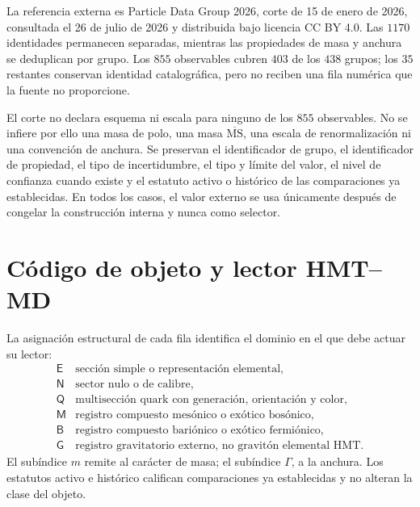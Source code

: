 La referencia externa es Particle Data Group 2026, corte de 15 de enero de
2026, consultada el 26 de julio de 2026 y distribuida bajo licencia CC BY 4.0.
Las \(1170\) identidades permanecen separadas, mientras las propiedades de masa
y anchura se deduplican por grupo. Los \(855\) observables cubren \(403\) de los
\(438\) grupos; los \(35\) restantes conservan identidad catalográfica, pero no
reciben una fila numérica que la fuente no proporcione.

El corte no declara esquema ni escala para ninguno de los \(855\) observables.
No se infiere por ello una masa de polo, una masa
\(\overline{\mathrm{MS}}\), una escala de renormalización ni una convención de
anchura. Se preservan el identificador de grupo, el identificador de propiedad,
el tipo de incertidumbre, el tipo y límite del valor, el nivel de confianza
cuando existe y el estatuto activo o histórico de las comparaciones ya
establecidas. En todos los casos, el valor externo se usa únicamente después
de congelar la construcción interna y nunca como selector.

\section{Código de objeto y lector HMT--MD}

La asignación estructural de cada fila identifica el dominio en el que debe
actuar su lector:
\[
\begin{array}{c|l}
\mathsf E&\text{sección simple o representación elemental},\\
\mathsf N&\text{sector nulo o de calibre},\\
\mathsf Q&\text{multisección quark con generación, orientación y color},\\
\mathsf M&\text{registro compuesto mesónico o exótico bosónico},\\
\mathsf B&\text{registro compuesto bariónico o exótico fermiónico},\\
\mathsf G&\text{registro gravitatorio externo, no gravitón elemental HMT}.
\end{array}
\tag{I2}\label{eq:cobertura-inventario-total-rev6}
\]
El subíndice \(m\) remite al carácter de masa; el subíndice \(\Gamma\), a la
anchura. Los estatutos activo e histórico califican comparaciones ya
establecidas y no alteran la clase del objeto.

